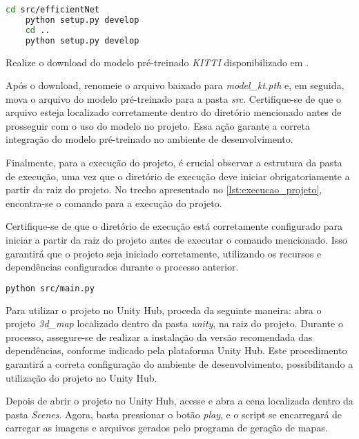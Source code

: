 \begin{lstlisting}[caption={Trecho de código com comandos para instalação da EfficientNet e EfficientPS \cite{efficientpsGit}},label={lst:instalar_efficientpsnet},language=Bash,showstringspaces=false]
    cd src/efficientNet
    python setup.py develop
    cd ..
    python setup.py develop
\end{lstlisting}

Realize o download do modelo pré-treinado \emph{KITTI} disponibilizado em .

Após o download, renomeie o arquivo baixado para \emph{model\_kt.pth} e, em seguida, mova o arquivo do modelo pré-treinado para a pasta \emph{src}. Certifique-se de que o arquivo esteja localizado corretamente dentro do diretório mencionado antes de prosseguir com o uso do modelo no projeto. Essa ação garante a correta integração do modelo pré-treinado no ambiente de desenvolvimento.

Finalmente, para a execução do projeto, é crucial observar a estrutura da pasta de execução, uma vez que o diretório de execução deve iniciar obrigatoriamente a partir da raiz do projeto. No trecho apresentado no \cref{lst:execucao_projeto}, encontra-se o comando para a execução do projeto.

Certifique-se de que o diretório de execução está corretamente configurado para iniciar a partir da raiz do projeto antes de executar o comando mencionado. Isso garantirá que o projeto seja iniciado corretamente, utilizando os recursos e dependências configurados durante o processo anterior.

\begin{lstlisting}[caption={Trecho de código com comando para execução do projeto},label={lst:execucao_projeto},language=Bash,showstringspaces=false]
    python src/main.py
\end{lstlisting}

Para utilizar o projeto no Unity Hub, proceda da seguinte maneira: abra o projeto \emph{3d\_map} localizado dentro da pasta \emph{unity}, na raiz do projeto. Durante o processo, assegure-se de realizar a instalação da versão recomendada das dependências, conforme indicado pela plataforma Unity Hub. Este procedimento garantirá a correta configuração do ambiente de desenvolvimento, possibilitando a utilização do projeto no Unity Hub.

Depois de abrir o projeto no Unity Hub, acesse e abra a cena localizada dentro da pasta \emph{Scenes}. Agora, basta pressionar o botão \emph{play}, e o script se encarregará de carregar as imagens e arquivos gerados pelo programa de geração de mapas.


